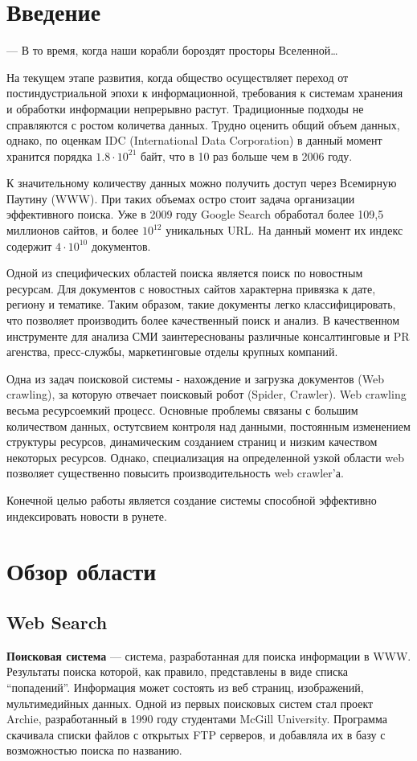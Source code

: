 \chapter*{Введение}
\epigraph{— В то время, когда наши корабли бороздят просторы
Вселенной…}{} На текущем этапе развития, когда общество осуществляет переход от
постиндустриальной эпохи к информационной, требования к системам хранения и
обработки информации непрерывно растут. Традиционные подходы не справляются с
ростом количетва данных. Трудно оценить общий объем данных, однако, по оценкам
IDC (International Data Corporation) в данный момент хранится порядка
$1.8\cdot10^{21}$ байт, что в 10 раз больше чем в 2006 году.

К значительному количеству данных можно получить доступ через Всемирную Паутину
(WWW). При таких объемах остро стоит задача организации эффективного поиска. Уже
в 2009 году Google Search обработал более 109,5 миллионов сайтов, и более
$10^{12}$ уникальных URL. На данный момент их индекс содержит $4\cdot10^{10}$ документов.

Одной из специфических областей поиска является поиск по новостным ресурсам.
 Для документов с новостных сайтов характерна привязка к дате, региону и тематике.
 Таким образом, такие документы легко классифицировать, что позволяет производить более качественный поиск и анализ.
 В качественном инструменте для анализа СМИ заинтереснованы различные консалтинговые и PR агенства, пресс-службы, маркетинговые отделы крупных компаний.

Одна из задач поисковой системы - нахождение и загрузка документов (Web crawling), за которую отвечает поисковый робот (Spider, Crawler).
 Web crawling весьма ресурсоемкий процесс. Основные проблемы связаны с большим количеством данных,
 остутсвием  контроля над данными, постоянным изменением структуры ресурсов, динамическим созданием страниц и низким качеством некоторых ресурсов.
 Однако, специализация на определенной узкой области web позволяет существенно повысить производительность web crawler'а.

Конечной целью работы является создание системы способной эффективно индексировать новости в рунете.

\chapter{Обзор области}
\section{Web Search} 
\textbf{Поисковая система} --- система, разработанная для
поиска информации в WWW. Результаты поиска которой, как правило, представлены в
виде списка ``попадений''. Информация может состоять из веб страниц,  изображений,
мультимедийных данных. Одной из первых поисковых систем стал
проект Archie, разработанный в 1990 году студентами McGill University. Программа скачивала
списки файлов с открытых FTP серверов, и добавляла их в базу с возможностью
поиска по названию. %

